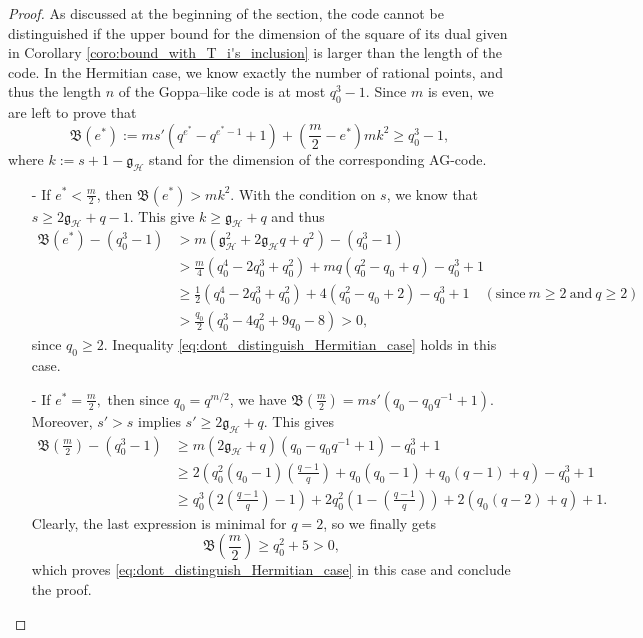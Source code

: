 \documentclass[a4paper]{article}
\theoremstyle{definition}
\theoremstyle{remark}
\newcommand{\calH}{\mathcal{H}}
\begin{document}
\begin{proof}
    As discussed at the beginning of the section, the code cannot be distinguished if the upper bound for the dimension of the square of its dual given in Corollary \ref{coro:bound_with_T_i's_inclusion} is larger than the length of the code. In the Hermitian case, we know exactly the number of rational points, and thus the length $n$ of the Goppa--like code is at most $q_0^3-1$. Since $m$ is even, we are left to prove that 
    \begin{equation} \label{eq:dont_distinguish_Hermitian_case}
    \mathfrak{B}(e^*) := ms'(q^{e^*}-q^{e^*-1}+1) + \left( \frac{m}{2}-e^*\right)mk^2 \geq q_0^3-1,
    \end{equation}
    where $k := s+1-\mathfrak{g}_{\calH}$ stand for the dimension of the corresponding AG-code.
    \begin{itemize}
        \item [-] If $e^* < \frac{m}{2}$, then $\mathfrak{B}(e^*) > mk^2$. With the condition on $s$, we know that $s \geq 2\mathfrak{g}_{\calH}+q-1$. This give $k \geq \mathfrak{g}_{\calH}+q$ and thus
        \begin{align*}
\mathfrak{B}(e^*) - (q_0^3-1) 
&> m(\mathfrak{g}_{\calH}^2+2\mathfrak{g}_{\calH}q+q^2)-(q_0^3-1)\\
& > \frac{m}{4}(q_0^4-2q_0^3+q_0^2) + mq(q_0^2-q_0+q) -q_0^3+1 \\
& \geq \frac{1}{2}(q_0^4-2q_0^3+q_0^2)+4(q_0^2-q_0+2)-q_0^3+1 \quad (\mathrm{since} \ m\geq 2 \ \mathrm{and} \ q\geq 2)\\
& > \frac{q_0}{2} (q_0^3-4q_0^2+9q_0-8) > 0,
        \end{align*}
        since $q_0 \geq 2$. Inequality \eqref{eq:dont_distinguish_Hermitian_case} holds in this case.
        \item[-] If $e^* = \frac{m}{2},$ then since $q_0=q^{m/2}$, we have $\mathfrak{B}\left(\frac{m}{2}\right) = ms'(q_0-q_0q^{-1}+1)$. Moreover, $s'>s$ implies $s' \geq 2\mathfrak{g}_{\calH}+q$. This gives
        \begin{align*}
           \mathfrak{B}\left(\frac{m}{2}\right) - (q_0^3-1) 
           &\geq m(2\mathfrak{g}_{\calH}+q)(q_0-q_0q^{-1}+1)-q_0^3+1 \\ 
           &\geq 2\left(q_0^2(q_0-1)\left(\frac{q-1}{q}\right)+q_0(q_0-1)+q_0(q-1)+q\right)-q_0^3+1 \\
           & \geq q_0^3\left(2\left(\frac{q-1}{q}\right)-1\right) + 2q_0^2\left(1-\left(\frac{q-1}{q}\right)\right) + 2(q_0(q-2)+q)+1.
        \end{align*}
        Clearly, the last expression is minimal for $q=2$, so we finally gets
        $$\mathfrak{B}\left(\frac{m}{2}\right) \geq q_0^2 + 5 >0,$$
        which proves \eqref{eq:dont_distinguish_Hermitian_case} in this case and conclude the proof.
    \end{itemize}
\end{proof}
\end{document}
